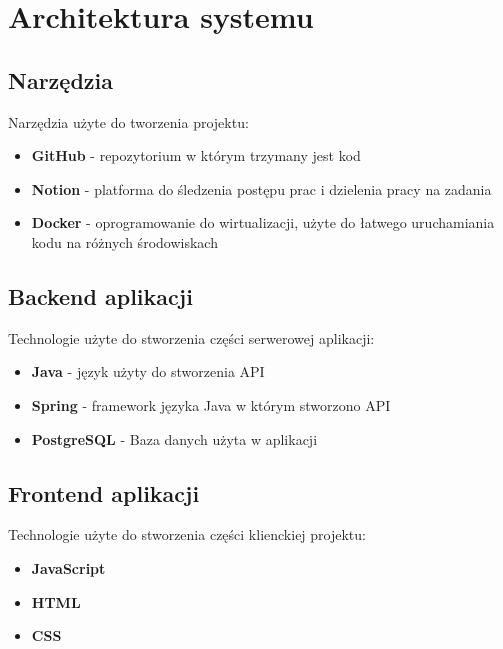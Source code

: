 \documentclass[12pt]{article}
\begin{document}
\newpage
\section{Architektura systemu}
\subsection{Narzędzia}
Narzędzia użyte do tworzenia projektu:
\begin{itemize}
\item \textbf{GitHub} - repozytorium w którym trzymany jest kod
\item \textbf{Notion} - platforma do śledzenia postępu prac i dzielenia pracy na zadania
\item \textbf{Docker} - oprogramowanie do wirtualizacji, użyte do łatwego uruchamiania kodu na różnych środowiskach
\end{itemize}
\subsection{Backend aplikacji}
Technologie użyte do stworzenia części serwerowej aplikacji:
\begin{itemize}
\item \textbf{Java} - język użyty do stworzenia API
\item \textbf{Spring} - framework języka Java w którym stworzono API
\item \textbf{PostgreSQL} - Baza danych użyta w aplikacji

\end{itemize}
\subsection{Frontend aplikacji}
Technologie użyte do stworzenia części klienckiej projektu:
\begin{itemize}
\item \textbf{JavaScript}
\item \textbf{HTML}
\item \textbf{CSS}
\end{itemize}
\end{document}
